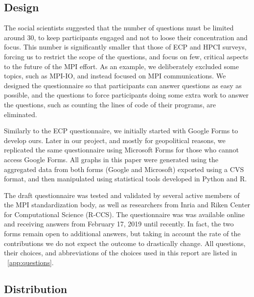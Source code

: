 \documentclass[preprint,5p,times]{elsarticle}
\begin{document}
\subsection*{Design}
%
The social scientists suggested that the number of questions must be limited
around 30, to keep participants engaged and not to loose their concentration and
focus. This number is significantly smaller that those of ECP and HPCI surveys,
forcing us to restrict the scope of the questions, and focus on few, critical
aspects to the future of the MPI effort. As an example, we deliberately excluded
some topics, such as MPI-IO, and instead focused on MPI communications.
We designed the questionnaire so that participants can answer questions
as easy as possible, and the questions to force participants doing
some extra work to answer the questions, such as counting the lines of
code of their programs, are eliminated. 

Similarly to the ECP questionnaire, we initially started with Google Forms to
develop ours. Later in our project, and mostly for geopolitical reasons, we
replicated the same questionnaire using Microsoft Forms for those who cannot
access Google Forms. All graphs in this paper were generated using the
aggregated data from both forms (Google and Microsoft) exported using a CVS
format, and then manipulated using statistical tools developed in Python and R.

The draft questionnaire was tested and validated by several active members of
the MPI standardization body, as well as researchers from Inria and Riken Center
for Computational Science (R-CCS).
The questionnaire was was available online and receiving answers from February
17, 2019 until recently. In fact, the two forms remain open to additional
answers, but taking in account the rate of the contributions we do not expect
the outcome to drastically change.
All questions, their choices, and abbreviations of the choices used in
this report are listed in ~\ref{app:questions}.

\subsection*{Distribution}
\end{document}
